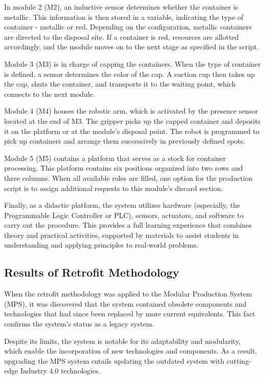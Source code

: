\documentclass[journal]{IEEEtran}
\begin{document}
In module 2 (M2), an inductive sensor determines whether the container is metallic. This information is then stored in a variable, indicating the type of container - metallic or red. Depending on the configuration, metallic containers are directed to the disposal site. If a container is red, resources are allotted accordingly, and the module moves on to the next stage as specified in the script.

Module 3 (M3) is in charge of capping the containers. When the type of container is defined, a sensor determines the color of the cap. A suction cup then takes up the cap, shuts the container, and transports it to the waiting point, which connects to the next module.

Module 4 (M4) houses the robotic arm, which is activated by the presence sensor located at the end of M3. The gripper picks up the capped container and deposits it on the platform or at the module's disposal point. The robot is programmed to pick up containers and arrange them successively in previously defined spots.

Module 5 (M5) contains a platform that serves as a stock for container processing. This platform contains six positions organized into two rows and three columns. When all available roles are filled, one option for the production script is to assign additional requests to this module's discard section.

Finally, as a didactic platform, the system utilizes hardware (especially, the Programmable Logic Controller or PLC), sensors, actuators, and software to carry out the procedure. This provides a full learning experience that combines theory and practical activities, supported by materials to assist students in understanding and applying principles to real-world problems.

\subsection{Results of Retrofit Methodology}

When the retrofit methodology was applied to the Modular Production System (MPS), it was discovered that the system contained obsolete components and technologies that had since been replaced by more current equivalents. This fact confirms the system's status as a legacy system.

Despite its limits, the system is notable for its adaptability and modularity, which enable the incorporation of new technologies and components. As a result, upgrading the MPS system entails updating the outdated system with cutting-edge Industry 4.0 technologies.
\end{document}
